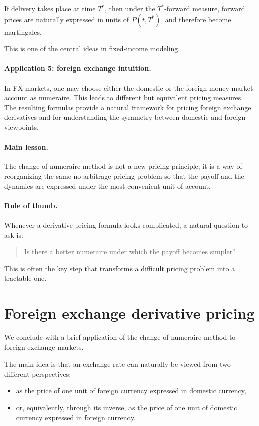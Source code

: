 \documentclass[11pt]{article}
\theoremstyle{definition}
\theoremstyle{plain}
\begin{document}
If delivery takes place at time \(T^\ast\), then under the
\(T^\ast\)-forward measure, forward prices are naturally expressed in
units of \(P(t,T^\ast)\), and therefore become martingales.

This is one of the central ideas in fixed-income modeling.

\paragraph{Application 5: foreign exchange intuition.}
In FX markets, one may choose either the domestic or the foreign money
market account as numeraire.
This leads to different but equivalent pricing measures.
The resulting formulas provide a natural framework for pricing foreign
exchange derivatives and for understanding the symmetry between
domestic and foreign viewpoints.

\paragraph{Main lesson.}
The change-of-numeraire method is not a new pricing principle; it is a
way of reorganizing the same no-arbitrage pricing problem so that the
payoff and the dynamics are expressed under the most convenient unit of
account.

\paragraph{Rule of thumb.}
Whenever a derivative pricing formula looks complicated, a natural
question to ask is:
\begin{quote}
Is there a better numeraire under which the payoff becomes simpler?
\end{quote}

This is often the key step that transforms a difficult pricing problem
into a tractable one.


\section{Foreign exchange derivative pricing}

We conclude with a brief application of the change-of-numeraire method
to foreign exchange markets.

The main idea is that an exchange rate can naturally be viewed from two
different perspectives:
\begin{itemize}[leftmargin=1.4em]
\item as the price of one unit of foreign currency expressed in domestic currency,
\item or, equivalently, through its inverse, as the price of one unit of domestic currency expressed in foreign currency.
\end{itemize}
\end{document}
